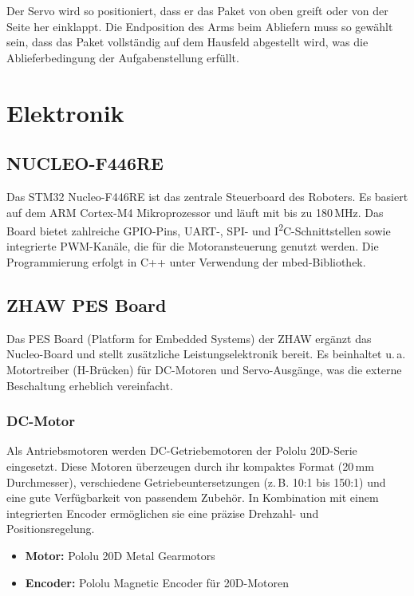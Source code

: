 \documentclass[12pt,a4paper]{article}
\begin{document}
	Der Servo wird so positioniert, dass er das Paket von oben greift oder von der Seite her einklappt. Die Endposition des Arms beim Abliefern muss so gewählt sein, dass das Paket vollständig auf dem Hausfeld abgestellt wird, was die Ablieferbedingung der Aufgabenstellung erfüllt.
	
	\section{Elektronik}
	
	\subsection{NUCLEO-F446RE}
	
	Das STM32 Nucleo-F446RE ist das zentrale Steuerboard des Roboters. Es basiert auf dem ARM Cortex-M4 Mikroprozessor und läuft mit bis zu 180\,MHz. Das Board bietet zahlreiche GPIO-Pins, UART-, SPI- und I\textsuperscript{2}C-Schnittstellen sowie integrierte PWM-Kanäle, die für die Motoransteuerung genutzt werden. Die Programmierung erfolgt in C++ unter Verwendung der mbed-Bibliothek.
	
	\subsection{ZHAW PES Board}
	
	Das PES Board (Platform for Embedded Systems) der ZHAW ergänzt das Nucleo-Board und stellt zusätzliche Leistungselektronik bereit. Es beinhaltet u.\,a. Motortreiber (H-Brücken) für DC-Motoren und Servo-Ausgänge, was die externe Beschaltung erheblich vereinfacht.
	
	\subsubsection{DC-Motor}
	
	Als Antriebsmotoren werden DC-Getriebemotoren der Pololu 20D-Serie eingesetzt. Diese Motoren überzeugen durch ihr kompaktes Format (20\,mm Durchmesser), verschiedene Getriebeuntersetzungen (z.\,B. 10:1 bis 150:1) und eine gute Verfügbarkeit von passendem Zubehör. In Kombination mit einem integrierten Encoder ermöglichen sie eine präzise Drehzahl- und Positionsregelung.
	
	\begin{itemize}
		\item \textbf{Motor:} Pololu 20D Metal Gearmotors \cite{pololu_motor}
		\item \textbf{Encoder:} Pololu Magnetic Encoder für 20D-Motoren \cite{pololu_encoder}
	\end{itemize}
	
\end{document}
